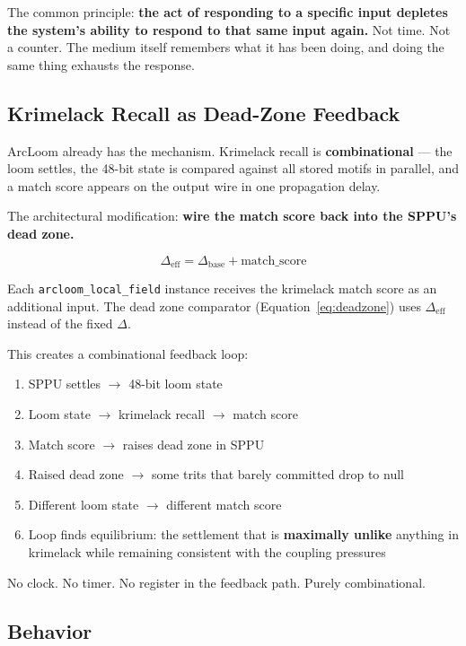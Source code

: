 \documentclass[11pt,a4paper]{article}
\begin{document}
The common principle: \textbf{the act of responding to a specific input depletes the system's ability to respond to that same input again.} Not time. Not a counter. The medium itself remembers what it has been doing, and doing the same thing exhausts the response.

\subsection{Krimelack Recall as Dead-Zone Feedback}

ArcLoom already has the mechanism. Krimelack recall is \textbf{combinational} --- the loom settles, the 48-bit state is compared against all stored motifs in parallel, and a match score appears on the output wire in one propagation delay.

The architectural modification: \textbf{wire the match score back into the SPPU's dead zone.}

\begin{equation}
\Delta_{\text{eff}} = \Delta_{\text{base}} + \text{match\_score}
\label{eq:familiarity}
\end{equation}

Each \texttt{arcloom\_local\_field} instance receives the krimelack match score as an additional input. The dead zone comparator (Equation~\ref{eq:deadzone}) uses $\Delta_{\text{eff}}$ instead of the fixed $\Delta$.

This creates a combinational feedback loop:

\begin{enumerate}
    \item SPPU settles $\rightarrow$ 48-bit loom state
    \item Loom state $\rightarrow$ krimelack recall $\rightarrow$ match score
    \item Match score $\rightarrow$ raises dead zone in SPPU
    \item Raised dead zone $\rightarrow$ some trits that barely committed drop to null
    \item Different loom state $\rightarrow$ different match score
    \item Loop finds equilibrium: the settlement that is \textbf{maximally unlike} anything in krimelack while remaining consistent with the coupling pressures
\end{enumerate}

No clock. No timer. No register in the feedback path. Purely combinational.

\subsection{Behavior}
\end{document}
